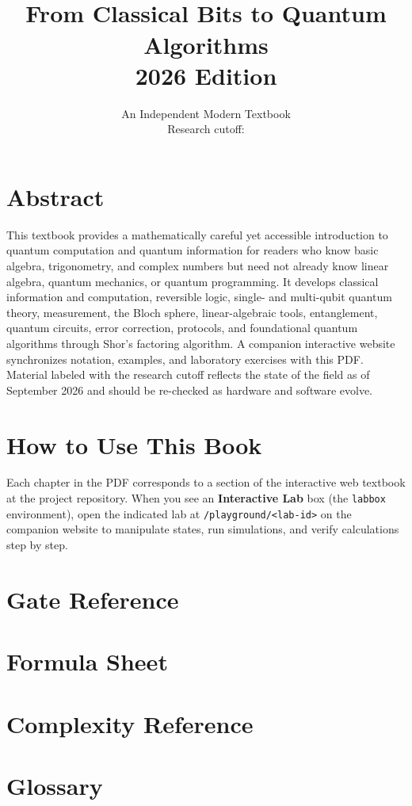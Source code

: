\documentclass[11pt,openany]{book}
\title{\iqc\\[0.5em]\large From Classical Bits to Quantum Algorithms\\[1em]\normalsize 2026 Edition}
\author{An Independent Modern Textbook\\Research cutoff: \cutoff}
\date{}
\newcommand{\cutoff}{September 2026}
\begin{document}
\frontmatter
\maketitle

\chapter*{Abstract}
\small
This textbook provides a mathematically careful yet accessible introduction to quantum computation and quantum information for readers who know basic algebra, trigonometry, and complex numbers but need not already know linear algebra, quantum mechanics, or quantum programming. It develops classical information and computation, reversible logic, single- and multi-qubit quantum theory, measurement, the Bloch sphere, linear-algebraic tools, entanglement, quantum circuits, error correction, protocols, and foundational quantum algorithms through Shor's factoring algorithm. A companion interactive website synchronizes notation, examples, and laboratory exercises with this PDF. Material labeled with the research cutoff reflects the state of the field as of \cutoff{} and should be re-checked as hardware and software evolve.
\normalsize

\tableofcontents
\listoffigures

\chapter*{How to Use This Book}

Each chapter in the PDF corresponds to a section of the interactive web textbook at the project repository. When you see an \textbf{Interactive Lab} box (the \texttt{labbox} environment), open the indicated lab at \texttt{/playground/<lab-id>} on the companion website to manipulate states, run simulations, and verify calculations step by step.

\mainmatter











\appendix
\chapter{Gate Reference}


\chapter{Formula Sheet}


\chapter{Complexity Reference}


\chapter{Glossary}


\backmatter


\end{document}
